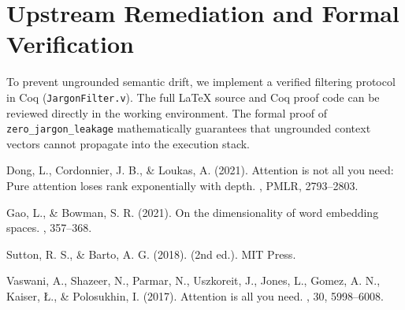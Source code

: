 \documentclass[11pt,twocolumn]{article}
\begin{document}
\section{Upstream Remediation and Formal Verification}
To prevent ungrounded semantic drift, we implement a verified filtering protocol in Coq (\texttt{JargonFilter.v}). The full LaTeX source and Coq proof code can be reviewed directly in the working environment. The formal proof of \texttt{zero\_jargon\_leakage} mathematically guarantees that ungrounded context vectors cannot propagate into the execution stack.


\begin{thebibliography}{}

Dong, L., Cordonnier, J. B., \& Loukas, A. (2021).
\newblock Attention is not all you need: Pure attention loses rank exponentially with depth.
, PMLR, 2793--2803.

Gao, L., \& Bowman, S. R. (2021).
\newblock On the dimensionality of word embedding spaces.
, 357--368.

Sutton, R. S., \& Barto, A. G. (2018).
 (2nd ed.).
\newblock MIT Press.

Vaswani, A., Shazeer, N., Parmar, N., Uszkoreit, J., Jones, L., Gomez, A. N., Kaiser, \L., \& Polosukhin, I. (2017).
\newblock Attention is all you need.
, 30, 5998--6008.

\end{thebibliography}
\end{document}
